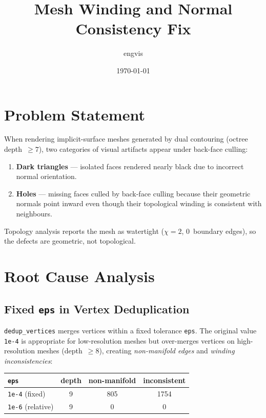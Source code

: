 \documentclass[11pt]{article}
\title{Mesh Winding and Normal Consistency Fix}
\author{engvis}
\date{\today}
\begin{document}
\maketitle

\section{Problem Statement}

When rendering implicit-surface meshes generated by dual contouring
(octree depth~$\geq 7$), two categories of visual artifacts appear
under back-face culling:
\begin{enumerate}
  \item \textbf{Dark triangles} --- isolated faces rendered nearly
        black due to incorrect normal orientation.
  \item \textbf{Holes} --- missing faces culled by back-face culling
        because their geometric normals point inward even though
        their topological winding is consistent with neighbours.
\end{enumerate}

Topology analysis reports the mesh as watertight
($\chi = 2$, $0$~boundary edges), so the defects are geometric, not
topological.

\section{Root Cause Analysis}

\subsection{Fixed \texttt{eps} in Vertex Deduplication}

\texttt{dedup\_vertices} merges vertices within a fixed tolerance
\texttt{eps}.  The original value \texttt{1e-4} is appropriate for
low-resolution meshes but over-merges vertices on high-resolution
meshes (depth~$\geq 8$), creating \emph{non-manifold edges} and
\emph{winding inconsistencies}:

\begin{center}
\begin{tabular}{lccc}
\toprule
\texttt{eps} & depth & non-manifold & inconsistent \\
\midrule
\texttt{1e-4} (fixed) & 9 & 805 & 1754 \\
\texttt{1e-6} (relative) & 9 & 0 & 0 \\
\bottomrule
\end{tabular}
\end{center}
\end{document}
